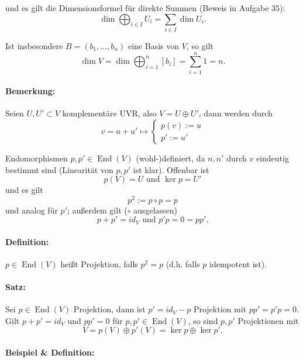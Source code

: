 	und es gilt die Dimensionsformel für direkte Summen (Beweis in Aufgabe 35):
		\begin{equation*}
		\dim \bigoplus_{i\in I}U_i = \sum_{i\in I} \dim U_i.
		\end{equation*}
	
	Ist insbesondere $ B=(b_1,...,b_n) $ eine Basis von $ V $, so gilt
		\begin{equation*}
		\dim V = \dim \bigoplus_{i=1}^n [b_i]=\sum_{i=1}^{n}1 = n.
		\end{equation*}
\paragraph{Bemerkung: }
	Seien $ U,U'\subset V $ komplementäre UVR, also $ V = U \oplus U' $, dann werden durch
		\begin{equation*}
		v = u+u' \mapsto
			\begin{cases}
			p(v):=u\\
			p':= u'
			\end{cases}
		\end{equation*}
	
	Endomorphismen $ p,p'\in \operatorname{End}(V) $ (wohl-)definiert, da $ n,n' $ durch $ v $ eindeutig bestimmt sind (Linearität von $ p,p' $ ist klar).
	Offenbar ist 
		\[ p(V) = U \text{ und } \ker p = U'\]
	und es gilt
		\[ p^2 := p\circ p = p \]
	und analog für $ p' $; außerdem gilt ($ \circ $ ausgelassen)
		\[ p+p' = id_V \text{ und } p'p = 0 = pp'.\]
		
\paragraph{Definition: }
	$ p\in \operatorname{End}(V) $ heißt Projektion, falls $ p^2 = p $ (d.h. falls $ p $ idempotent ist).
	
\paragraph{Satz: }
	Sei $ p\in \operatorname{End}(V) $ Projektion, dann ist $ p'= id_V-p $ Projektion mit $ pp' = p'p = 0 $. Gilt $ p+p' = id_V $ und $ pp' = 0 $ für $ p,p' \in \operatorname{End}(V) $, so sind $ p,p' $ Projektionen mit
		\[ V = p(V)\oplus p'(V) = \ker p \oplus \ker p'. \]
		
\paragraph{Beispiel \& Definition: }
